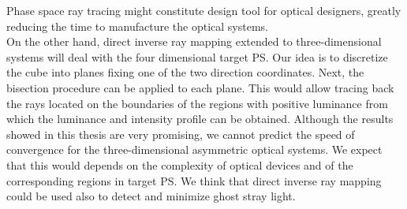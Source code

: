 Phase space ray tracing might constitute design tool for optical designers, greatly reducing the time to manufacture the optical systems.
\\ \indent 
On the other hand, direct inverse ray mapping extended to three-dimensional systems will deal with the four dimensional target PS. Our idea is to discretize the cube into planes fixing one of the two direction coordinates. Next, the bisection procedure can be applied to each plane. This would allow tracing back the rays located on the boundaries of the regions with positive luminance from which the luminance and intensity profile can be obtained. Although the results showed in this thesis are very promising, we cannot predict the speed of convergence for the three-dimensional asymmetric optical systems. We expect that this would depends on the complexity of optical devices and of the corresponding regions in target PS. 
We think that direct inverse ray mapping could be used also to detect and minimize ghost stray light.

